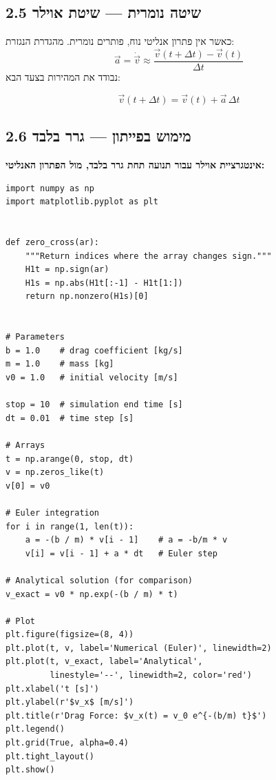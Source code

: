 \documentclass[12pt, a4paper]{article}
\newcommand{\hvec}[1]{\overrightarrow{#1}}
\begin{document}
\subsection*{2.5 שיטה נומרית --- שיטת אוילר}

כאשר אין פתרון אנליטי נוח, פותרים נומרית. מהגדרת הנגזרת:
\[
  \hvec{a} = \dot{\hvec{v}} \approx \frac{\hvec{v}(t+\Delta t) - \hvec{v}(t)}{\Delta t}
\]
נבודד את המהירות בצעד הבא:

\begin{tcolorbox}[resultbox, title={צעד אוילר}]
\[
  \hvec{v}(t+\Delta t) = \hvec{v}(t) + \hvec{a}\,\Delta t
\]
\end{tcolorbox}

\subsection*{2.6 מימוש בפייתון --- גרר בלבד}

\noindent\textbf{אינטגרציית אוילר עבור תנועה תחת גרר בלבד, מול הפתרון האנליטי:}

\begin{LTR}
\begin{lstlisting}[style=pycode]
import numpy as np
import matplotlib.pyplot as plt


def zero_cross(ar):
    """Return indices where the array changes sign."""
    H1t = np.sign(ar)
    H1s = np.abs(H1t[:-1] - H1t[1:])
    return np.nonzero(H1s)[0]


# Parameters
b = 1.0    # drag coefficient [kg/s]
m = 1.0    # mass [kg]
v0 = 1.0   # initial velocity [m/s]

stop = 10  # simulation end time [s]
dt = 0.01  # time step [s]

# Arrays
t = np.arange(0, stop, dt)
v = np.zeros_like(t)
v[0] = v0

# Euler integration
for i in range(1, len(t)):
    a = -(b / m) * v[i - 1]    # a = -b/m * v
    v[i] = v[i - 1] + a * dt   # Euler step

# Analytical solution (for comparison)
v_exact = v0 * np.exp(-(b / m) * t)

# Plot
plt.figure(figsize=(8, 4))
plt.plot(t, v, label='Numerical (Euler)', linewidth=2)
plt.plot(t, v_exact, label='Analytical',
         linestyle='--', linewidth=2, color='red')
plt.xlabel('t [s]')
plt.ylabel(r'$v_x$ [m/s]')
plt.title(r'Drag Force: $v_x(t) = v_0 e^{-(b/m) t}$')
plt.legend()
plt.grid(True, alpha=0.4)
plt.tight_layout()
plt.show()
\end{lstlisting}
\end{LTR}
\end{document}
